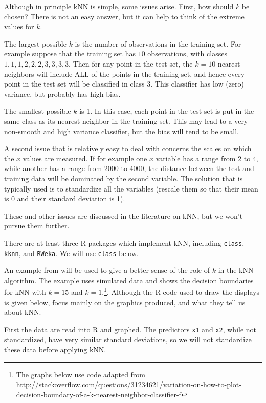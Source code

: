 \documentclass[
]{krantz}
\begin{document}
Although in principle kNN is simple, some issues arise. First, how should \(k\) be chosen? There is not an easy answer, but it can help to think of the extreme values for \(k\).

The largest possible \(k\) is the number of observations in the training set. For example suppose that the training set has \(10\) observations, with classes \(1, 1, 1, 2, 2, 2, 3, 3, 3, 3\). Then for any point in the test set, the \(k=10\) nearest neighbors will include ALL of the points in the training set, and hence every point in the test set will be classified in class 3. This classifier has low (zero) variance, but probably has high bias.

The smallest possible \(k\) is 1. In this case, each point in the test set is put in the same class as its nearest neighbor in the training set. This may lead to a very non-smooth and high variance classifier, but the bias will tend to be small.

A second issue that is relatively easy to deal with concerns the scales on which the \(x\) values are measured. If for example one \(x\) variable has a range from 2 to 4, while another has a range from 2000 to 4000, the distance between the test and training data will be dominated by the second variable. The solution that is typically used is to standardize all the variables (rescale them so that their mean is 0 and their standard deviation is 1).

These and other issues are discussed in the literature on kNN, but we won't pursue them further.

There are at least three R packages which implement kNN, including \texttt{class}, \texttt{kknn}, and \texttt{RWeka}. We will use \texttt{class} below.

An example from \citet{hastieESL} will be used to give a better sense of the role of \(k\) in the kNN algorithm. The example uses simulated data and shows the decision boundaries for kNN with \(k=15\) and \(k=1\).\footnote{The graphs below use code adapted from \url{http://stackoverflow.com/questions/31234621/variation-on-how-to-plot-decision-boundary-of-a-k-nearest-neighbor-classifier-f}}. Although the R code used to draw the displays is given below, focus mainly on the graphics produced, and what they tell us about kNN.

First the data are read into R and graphed. The predictors \texttt{x1} and \texttt{x2}, while not standardized, have very similar standard deviations, so we will not standardize these data before applying kNN.
\end{document}
